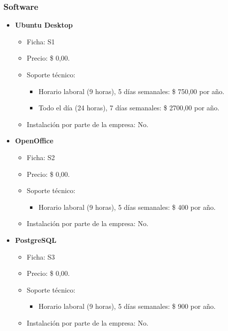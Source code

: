 \subsubsection{Software}
\begin{itemize}
  \item \textbf{Ubuntu Desktop}
    \begin{itemize}
      \item Ficha: S1
      \item Precio: \$ 0,00.
      \item Soporte técnico:
        \begin{itemize}
          \item Horario laboral (9 horas), 5 días semanales: \$ 750,00 por año.
          \item Todo el día (24 horas), 7 días semanales: \$ 2700,00 por año.
        \end{itemize}
      \item Instalación por parte de la empresa: No.
    \end{itemize}
    
  \item \textbf{OpenOffice}
    \begin{itemize}
      \item Ficha: S2
      \item Precio: \$ 0,00.
      \item Soporte técnico:
        \begin{itemize}
          \item Horario laboral (9 horas), 5 días semanales: \$ 400 por año.
        \end{itemize}
      \item Instalación por parte de la empresa: No.
    \end{itemize}
  
  \item \textbf{PostgreSQL}
    \begin{itemize}
      \item Ficha: S3
      \item Precio: \$ 0,00.
      \item Soporte técnico:
        \begin{itemize}
          \item Horario laboral (9 horas), 5 días semanales: \$ 900 por año.
        \end{itemize}
      \item Instalación por parte de la empresa: No.
    \end{itemize}
\end{itemize}

